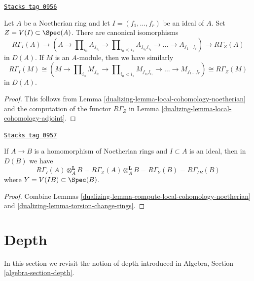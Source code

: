 \begin{lemma}
\label{dualizing-lemma-compute-local-cohomology-noetherian}
\href{https://stacks.math.columbia.edu/tag/0956}{\texttt{Stacks tag 0956}}

Let $A$ be a Noetherian ring and let $I = (f_1, \ldots, f_r)$ be an ideal
of $A$. Set $Z = V(I) \subset \Spec(A)$. There are canonical isomorphisms
$$
R\Gamma_I(A) \to
(A \to \prod\nolimits_{i_0} A_{f_{i_0}} \to
\prod\nolimits_{i_0 < i_1} A_{f_{i_0}f_{i_1}} \to
\ldots \to A_{f_1\ldots f_r}) \to R\Gamma_Z(A)
$$
in $D(A)$. If $M$ is an $A$-module, then we have similarly
$$
R\Gamma_I(M) \cong
(M \to \prod\nolimits_{i_0} M_{f_{i_0}} \to
\prod\nolimits_{i_0 < i_1} M_{f_{i_0}f_{i_1}} \to
\ldots \to M_{f_1\ldots f_r}) \cong R\Gamma_Z(M)
$$
in $D(A)$.
\end{lemma}

\begin{proof}

This follows from Lemma \ref{dualizing-lemma-local-cohomology-noetherian}
and the computation of the functor $R\Gamma_Z$ in
Lemma \ref{dualizing-lemma-local-cohomology-adjoint}.
\end{proof}

\begin{lemma}
\label{dualizing-lemma-local-cohomology-change-rings}
\href{https://stacks.math.columbia.edu/tag/0957}{\texttt{Stacks tag 0957}}

If $A \to B$ is a homomorphism of Noetherian rings and $I \subset A$
is an ideal, then in $D(B)$ we have
$$
R\Gamma_I(A) \otimes_A^\mathbf{L} B =
R\Gamma_Z(A) \otimes_A^\mathbf{L} B =
R\Gamma_Y(B) = R\Gamma_{IB}(B)
$$
where $Y = V(IB) \subset \Spec(B)$.
\end{lemma}

\begin{proof}

Combine Lemmas \ref{dualizing-lemma-compute-local-cohomology-noetherian} and
\ref{dualizing-lemma-torsion-change-rings}.
\end{proof}

\section{Depth}
\label{dualizing-section-depth}
In this section we revisit the notion of depth introduced in
Algebra, Section \ref{algebra-section-depth}.


